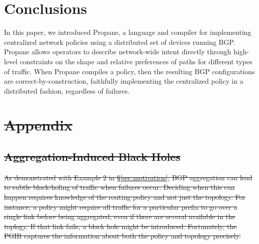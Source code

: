 \documentclass[10pt]{sigalternate052015} %
\newcommand{\sysname}{{\small \sf Propane}\xspace}
\providecommand{\DIFdel}[1]{{\protect\color{red}\sout{#1}}}                      %
\providecommand{\DIFaddend}{} %
\providecommand{\DIFdelbegin}{} %
\begin{document}
\DIFaddend %
%
%

\section{Conclusions}
\label{sec:conclusions}

In this paper, we introduced \sysname, a language and compiler for implementing centralized network policies using a distributed set of devices running BGP. Propane allows operators to describe network-wide intent directly through high-level constraints on the shape and relative preferences of paths for different types of traffic. When \sysname compiles a policy, then the resulting BGP configurations are correct-by-construction, faithfully implementing the centralized policy in a distributed fashion, regardless of failures.



%
%
%
%


\DIFdelbegin \section*{\DIFdel{Appendix}}


\subsection{\DIFdel{Aggregation-Induced Black Holes}}
\addtocounter{subsection}{-1}%


\DIFdel{As demonstrated with Example 2 in \S\ref{sec:motivation}, BGP aggregation can lead to subtle black-holing of traffic when failures occur. Deciding when this can happen requires knowledge of the routing policy and not just the topology. For instance, a policy might require all traffic for a particular prefix to go over a single link before being aggregated, even if there are several available in the toplogy. If that link fails, a black hole might be introduced. Fortunately, the PGIR captures the information about both the policy and topology precisely.
}%
\end{document}
